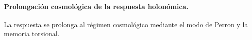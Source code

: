\let\HMTOwnerSubsubsection\subsubsection
\let\HMTOwnerParagraph\paragraph
\let\chapter\HMTOwnerSection
\let\section\HMTOwnerSubsection
\let\subsection\HMTOwnerSubsubsection
\let\subsubsection\HMTOwnerParagraph

\endgroup
\paragraph{Prolongación cosmológica de la respuesta holonómica.}
La respuesta se prolonga al régimen cosmológico mediante el modo de Perron y
la memoria torsional.

